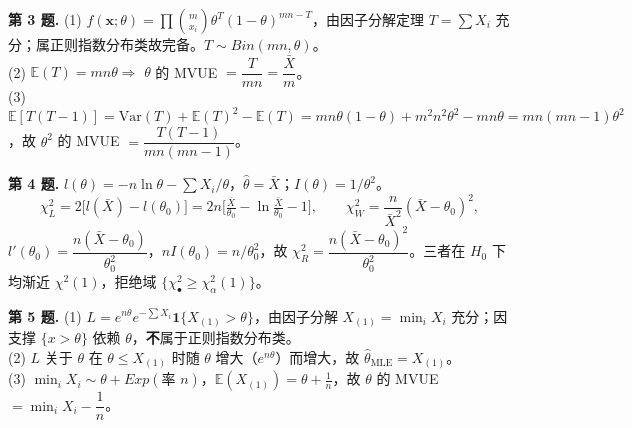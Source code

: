 \documentclass[12pt,a4paper]{ctexart}
\newcommand{\E}{\mathbb{E}}
\newcommand{\Var}{\mathrm{Var}}
\begin{document}
\smallskip
\noindent\textbf{第 3 题.}\;
(1) $f(\mathbf x;\theta)=\prod\binom{m}{x_i}\theta^{T}(1-\theta)^{mn-T}$，由因子分解定理 $T=\sum X_i$ 充分；属正则指数分布类故完备。$T\sim Bin(mn,\theta)$。\\
(2) $\E(T)=mn\theta\Rightarrow$ $\theta$ 的 MVUE $=\dfrac{T}{mn}=\dfrac{\bar X}{m}$。\\
(3) $\E[T(T-1)]=\Var(T)+\E(T)^2-\E(T)=mn\theta(1-\theta)+m^2n^2\theta^2-mn\theta=mn(mn-1)\theta^2$，故 $\theta^2$ 的 MVUE $=\boxed{\dfrac{T(T-1)}{mn(mn-1)}}$。

\smallskip
\noindent\textbf{第 4 题.}\;
$l(\theta)=-n\ln\theta-\sum X_i/\theta$，$\hat\theta=\bar X$；$I(\theta)=1/\theta^2$。
\[
\chi_L^2=2\Big[l(\bar X)-l(\theta_0)\Big]=2n\Big[\tfrac{\bar X}{\theta_0}-\ln\tfrac{\bar X}{\theta_0}-1\Big],\qquad
\chi_W^2=\frac{n}{\bar X^2}(\bar X-\theta_0)^2,
\]
$l'(\theta_0)=\dfrac{n(\bar X-\theta_0)}{\theta_0^2}$，$nI(\theta_0)=n/\theta_0^2$，故 $\chi_R^2=\dfrac{n(\bar X-\theta_0)^2}{\theta_0^2}$。三者在 $H_0$ 下均渐近 $\chi^2(1)$，拒绝域 $\{\chi^2_\bullet\ge\chi^2_\alpha(1)\}$。

\smallskip
\noindent\textbf{第 5 题.}\;
(1) $L=e^{n\theta}e^{-\sum X_i}\mathbf 1\{X_{(1)}>\theta\}$，由因子分解 $X_{(1)}=\min_i X_i$ 充分；因支撑 $\{x>\theta\}$ 依赖 $\theta$，\textbf{不}属于正则指数分布类。\\
(2) $L$ 关于 $\theta$ 在 $\theta\le X_{(1)}$ 时随 $\theta$ 增大（$e^{n\theta}$）而增大，故 $\hat\theta_{\text{MLE}}=X_{(1)}$。\\
(3) $\min_i X_i\sim\theta+Exp(\text{率 }n)$，$\E(X_{(1)})=\theta+\tfrac1n$，故 $\theta$ 的 MVUE $=\boxed{\min_i X_i-\dfrac1n}$。
\end{document}

